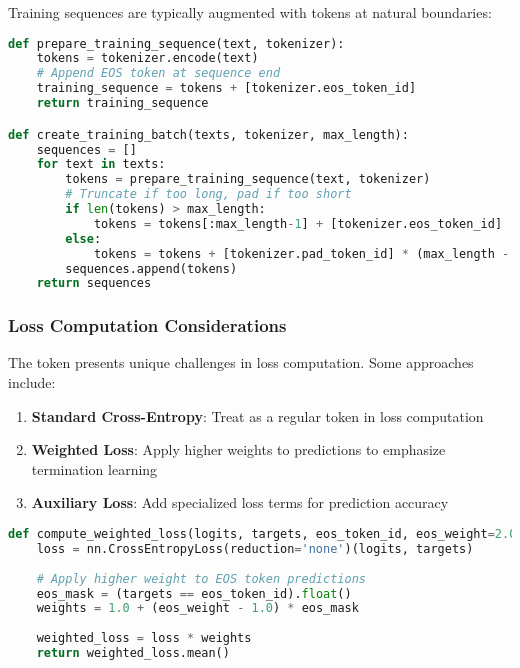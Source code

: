 Training sequences are typically augmented with \eos{} tokens at natural boundaries:

\begin{lstlisting}[language=Python, caption=Training data preparation with \eos{} tokens]
def prepare_training_sequence(text, tokenizer):
    tokens = tokenizer.encode(text)
    # Append EOS token at sequence end
    training_sequence = tokens + [tokenizer.eos_token_id]
    return training_sequence

def create_training_batch(texts, tokenizer, max_length):
    sequences = []
    for text in texts:
        tokens = prepare_training_sequence(text, tokenizer)
        # Truncate if too long, pad if too short
        if len(tokens) > max_length:
            tokens = tokens[:max_length-1] + [tokenizer.eos_token_id]
        else:
            tokens = tokens + [tokenizer.pad_token_id] * (max_length - len(tokens))
        sequences.append(tokens)
    return sequences
\end{lstlisting}

\subsubsection{Loss Computation Considerations}

The \eos{} token presents unique challenges in loss computation. Some approaches include:

\begin{enumerate}
\item \textbf{Standard Cross-Entropy}: Treat \eos{} as a regular token in loss computation
\item \textbf{Weighted Loss}: Apply higher weights to \eos{} predictions to emphasize termination learning
\item \textbf{Auxiliary Loss}: Add specialized loss terms for \eos{} prediction accuracy
\end{enumerate}

\begin{lstlisting}[language=Python, caption=Weighted loss for \eos{} token training]
def compute_weighted_loss(logits, targets, eos_token_id, eos_weight=2.0):
    loss = nn.CrossEntropyLoss(reduction='none')(logits, targets)
    
    # Apply higher weight to EOS token predictions
    eos_mask = (targets == eos_token_id).float()
    weights = 1.0 + (eos_weight - 1.0) * eos_mask
    
    weighted_loss = loss * weights
    return weighted_loss.mean()
\end{lstlisting}

